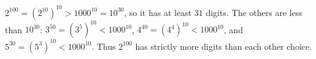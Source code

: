 $2^{100}=(2^{10})^{10}>1000^{10}=10^{30}$, so it has at least $31$ digits. The others are less than $10^{30}$: $3^{50}=(3^5)^{10}<1000^{10}$, $4^{40}=(4^4)^{10}<1000^{10}$, and $5^{30}=(5^3)^{10}<1000^{10}$. Thus $\boxed{2^{100}}$ has strictly more digits than each other choice.
